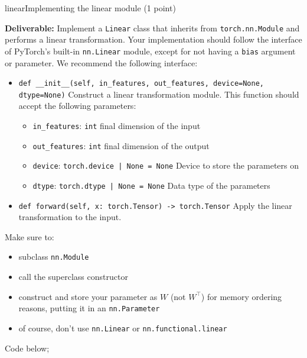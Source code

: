 \begin{problembox}{linear}{Implementing the linear module \hfill (1 point)}

    \textbf{Deliverable:} Implement a \texttt{Linear} class that inherits from \texttt{torch.nn.Module} and performs a linear transformation. Your implementation should follow the interface of PyTorch's built-in \texttt{nn.Linear} module, except for not having a \texttt{bias} argument or parameter. We recommend the following interface:

    \begin{itemize}[label={}, leftmargin=0pt, itemsep=1em, parsep=0pt]

        \item \texttt{def __init__(self, in_features, out_features, device=None, dtype=None)} Construct a linear transformation module. This function should accept the following parameters:

              \begin{itemize}[label={}, leftmargin=1.5em, itemsep=0.5em, parsep=0pt, topsep=0.5em]
                  \item \texttt{in\_features}: \textcolor{green!50!black}{\texttt{int}} final dimension of the input
                  \item \texttt{out\_features}: \textcolor{green!50!black}{\texttt{int}} final dimension of the output
                  \item \texttt{device}: \textcolor{green!50!black}{\texttt{torch.device | None = None}} Device to store the parameters on
                  \item \texttt{dtype}: \textcolor{green!50!black}{\texttt{torch.dtype | None = None}} Data type of the parameters
              \end{itemize}

        \item \texttt{def forward(self, x: torch.Tensor) -> torch.Tensor} Apply the linear transformation to the input.

    \end{itemize}

    Make sure to:
    \begin{itemize}[itemsep=0.5em, parsep=0pt, topsep=0.5em]
        \item subclass \texttt{nn.Module}
        \item call the superclass constructor
        \item construct and store your parameter as $W$ (not $W^\top$) for memory ordering reasons, putting it in an \texttt{nn.Parameter}
        \item of course, don't use \texttt{nn.Linear} or \texttt{nn.functional.linear}
    \end{itemize}

    \vspace{0.5em}

    Code below;

\end{problembox}

